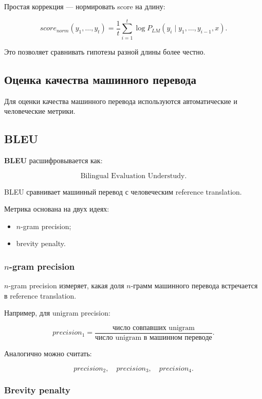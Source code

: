 \documentclass[a4paper,12pt]{article}
\begin{document}
Простая коррекция --- нормировать score на длину:

\[
score_{norm}(y_1,\dots,y_t)
=
\frac{1}{t}
\sum_{i=1}^{t}
\log P_{LM}(y_i \mid y_1,\dots,y_{i-1}, x).
\]

Это позволяет сравнивать гипотезы разной длины более честно.

\subsection{Оценка качества машинного перевода}

Для оценки качества машинного перевода используются автоматические и человеческие метрики.

\subsection{BLEU}

\textbf{BLEU} расшифровывается как:

\[
\text{Bilingual Evaluation Understudy}.
\]

BLEU сравнивает машинный перевод с человеческим reference translation.

Метрика основана на двух идеях:

\begin{itemize}
    \item \(n\)-gram precision;
    \item brevity penalty.
\end{itemize}

\subsubsection{\texorpdfstring{\(n\)-gram precision}{n-gram precision}}

\(n\)-gram precision измеряет, какая доля \(n\)-грамм машинного перевода встречается в reference translation.

Например, для unigram precision:

\[
precision_1
=
\frac{
\text{число совпавших unigram}
}{
\text{число unigram в машинном переводе}
}.
\]

Аналогично можно считать:

\[
precision_2, \quad precision_3, \quad precision_4.
\]

\subsubsection{Brevity penalty}
\end{document}
